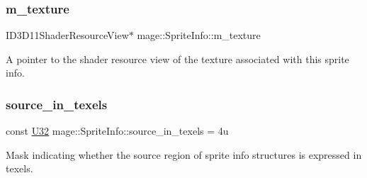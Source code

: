\subsubsection{\texorpdfstring{m\+\_\+texture}{m\_texture}}
{\footnotesize\ttfamily I\+D3\+D11\+Shader\+Resource\+View$\ast$ mage\+::\+Sprite\+Info\+::m\+\_\+texture}

A pointer to the shader resource view of the texture associated with this sprite info. \hypertarget{structmage_1_1_sprite_info_afe8aa37311d56f8411cfe878607f6f68}{}\label{structmage_1_1_sprite_info_afe8aa37311d56f8411cfe878607f6f68} 
\subsubsection{\texorpdfstring{source\+\_\+in\+\_\+texels}{source\_in\_texels}}
{\footnotesize\ttfamily const \hyperlink{namespacemage_a41c104c036fba3756a74e19f793eeaa1}{U32} mage\+::\+Sprite\+Info\+::source\+\_\+in\+\_\+texels = 4u\hspace{0.3cm}{\ttfamily [static]}}

Mask indicating whether the source region of sprite info structures is expressed in texels. 